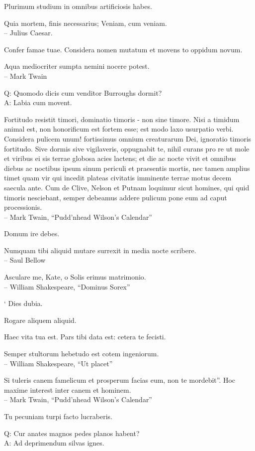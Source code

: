 \documentclass[titlepage,12pt]{memoir}
\begin{document}
Plurimum studium in omnibus artificiosis habes.

Quia mortem, finis necessarius;
Veniam, cum veniam.
\\-- Julius Caesar.

Confer famae tuae. Considera nomen mutatum et movens to
oppidum novum.

Aqua mediocriter sumpta nemini nocere potest.
\\-- Mark Twain

Q: Quomodo dicis cum venditor Burroughs dormit?\\
A: Labia cum movent.

Fortitudo resistit timori, dominatio timoris - non sine timore. Nisi a
timidum animal est, non honorificum est fortem esse; est modo
laxo usurpatio verbi. Considera pulicem unum!
fortissimus omnium creaturarum Dei, ignoratio timoris fortitudo.
Sive dormis sive vigilaveris, oppugnabit te, nihil curans pro re
ut mole et viribus ei sis terrae globosa acies
lactens; et die ac nocte vivit et omnibus diebus ac noctibus
ipsum sinum periculi et praesentis mortis, nec tamen amplius
timet quam vir qui incedit plateas civitatis imminente
terrae motus decem saecula ante. Cum de Clive, Nelson et Putnam loquimur
sicut homines, qui quid timoris nesciebant, semper debeamus addere pulicum
pone eum ad caput processionis.
\\-- Mark Twain, “Pudd’nhead Wilson’s Calendar”

Domum ire debes.

Numquam tibi aliquid mutare surrexit in media nocte
scribere.
\\-- Saul Bellow

Asculare me, Kate, o Solis erimus matrimonio.
\\-- William Shakespeare, “Dominus Sorex”

‘ Dies dubia.

Rogare aliquem aliquid.

Haec vita tua est. Pars tibi data est: cetera te fecisti.

Semper stultorum hebetudo est cotem ingeniorum.
\\-- William Shakespeare, “Ut placet”

Si tuleris canem famelicum et prosperum facias eum, non te mordebit”.
Hoc maxime interest inter canem et hominem.
\\-- Mark Twain, “Pudd’nhead Wilson’s Calendar”

Tu pecuniam turpi facto lucraberis.

Q: Cur anates magnos pedes planos habent?\\
A: Ad deprimendum silvas ignes.
\end{document}
